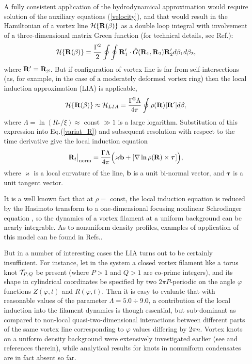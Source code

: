 \documentclass[pra,twocolumn,showpacs]{revtex4}
\begin{document}
A fully consistent application of the hydrodynamical approximation would require solution of the 
auxiliary equations (\ref{velocity}), and that would result in the Hamiltonian of a vortex line 
${\cal H}\{{\bf R}(\beta)\}$ as a double loop integral with involvement of a three-dimensional
matrix Green function (for technical details, see Ref.\cite{R2017-2}):
\begin{equation}
{\cal H}\{{\bf R}(\beta)\}=\frac{\Gamma^2}{2}\oint\oint 
{\bf R}_1'\cdot \hat G({\bf R}_1, {\bf R}_2) {\bf R}_2'd\beta_1 d\beta_2,
\end{equation}
where ${\bf R}'={\bf R}_\beta$. But if configuration of vortex line is far from self-intersections
(as, for example, in the case of a moderately deformed vortex ring) then the local induction 
approximation (LIA) is applicable,
\begin{equation}
{\cal H}\{{\bf R}(\beta)\}\approx {\cal H}_{LIA}=
\frac{\Gamma^2\Lambda}{4\pi}\oint\rho({\bf R})|{\bf R}'|d\beta,
\end{equation}
where $\Lambda=\ln(R_*/\xi)\approx$ const $\gg 1$ is a large logarithm. Substitution of this expression
into Eq.(\ref{variat_R}) and subsequent resolution with respect to the time derivative give 
the local induction equation \cite{SF2000,FS2001,R2001}
\begin{equation}
{\mathbf R}_t\big|_{\rm norm}=\frac{\Gamma \Lambda}{4\pi}\Big(\varkappa {\mathbf b}
+[\nabla\ln\rho({\mathbf R})\times {\boldsymbol \tau}]\Big),
\label{LIA}
\end{equation}
where  $\varkappa$ is a local curvature of the line, ${\mathbf b}$ is a unit bi-normal vector, 
and ${\boldsymbol \tau}$ is a unit tangent vector.

It is a well known fact that at $\rho =$ const, the local induction equation is reduced by the Hasimoto
transform to a one-dimensional focusing nonlinear Schrodinger equation \cite{Hasimoto}, so
the dynamics of a vortex filament at a uniform background can be nearly integrable. As to nonuniform
density profiles, examples of application of this model can be found in 
Refs.\cite{Kelvin_vaves,ring_istability,R2016-1,R2016-2,R2017-3}.

But in a number of interesting cases the LIA turns out to be certainly insufficient.
For instance, let in the system a closed vortex filament like a torus knot ${\cal T}_{P,Q}$ be present
(where $P>1$ and $Q>1$ are co-prime integers), and its shape in cylindrical coordinates be specified 
by two $2\pi P$-periodic on the angle $\varphi$ functions $Z(\varphi,t)$ and $R(\varphi,t)$.
Then it is easy to evaluate that with reasonable values of the parameter $\Lambda=5.0\div 9.0$, 
a contribution of the local induction into the filament dynamics is though essential, but sub-dominant
as compared to non-local quasi-two-dimensional interactions between different parts 
of the same vortex line corresponding to $\varphi$ values differing by $2\pi n$. 
Vortex knots on a uniform density background were extensively investigated 
earlier (see  \cite{RSB999,MABR2010,POB2012,KI2013,POB2014,LMB016,KKI2016} and references therein),
while analytical results for knots in nonuniform condensates are in fact absent so far.
\end{document}
